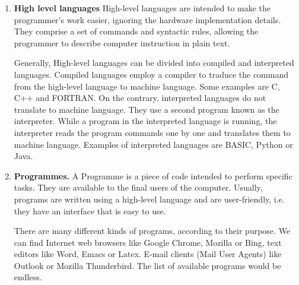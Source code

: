 \begin{paracol}{2}
\begin{enumerate}
\item \textbf{High level languages} 
High-level languages are intended to make the programmer's work easier, ignoring the hardware implementation details.   They comprise a set of commands and syntactic rules, allowing the programmer to describe computer instruction in plain text.

Generally, High-level languages can be divided into compiled and interpreted languages. Compiled languages employ a compiler to traduce the command from the high-level language to machine language. Some examples are C, C++ and FORTRAN. On the contrary, interpreted languages do not translate to machine language. They use a second program known as the interpreter. While a program in the interpreted language is running, the interpreter reads the program commands one by one and translates them to machine language. Examples of interpreted languages are BASIC, Python or Java.  


\item \textbf{Programmes.}  
A Programme is a piece of code intended to perform specific tasks. They are available to the final users of the computer. Usually, programs are written using a high-level language and are user-friendly, i.e. they have an interface that is easy to use.

There are many different kinds of programs, according to their purpose. We can find Internet web browsers like Google Chrome, Mozilla or Bing, text editors like Word, Emacs or Latex.    
E-mail clients (Mail User Agents) like Outlook or Mozilla Thunderbird. The list of available programs would be endless. 
\end{enumerate}

\end{paracol}



